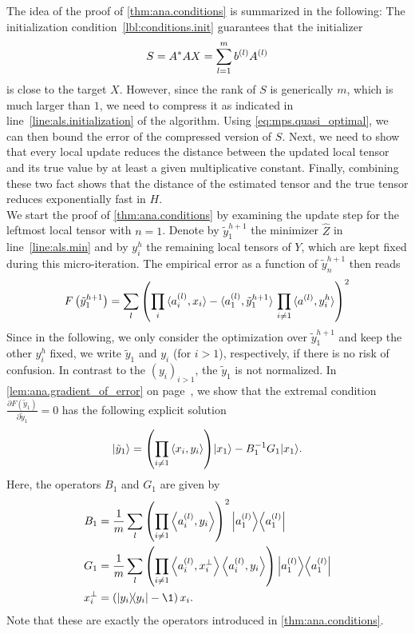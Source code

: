 The idea of the proof of \cref{thm:ana.conditions} is summarized in the following:
The initialization condition~\ref{lbl:conditions.init} guarantees that the initializer
\[
  S = {{A}^\ast}A X = \sum_{l=1}^m b^{(l)} A^{(l)}
\]
is close to the target $X$.
However, since the rank of $S$ is generically $m$, which is much larger than $1$, we need to compress it as indicated in line~\ref{line:als.initialization} of the algorithm.
Using \cref{eq:mps.quasi_optimal}, we can then bound the error of the compressed version of $S$.
Next, we need to show that every local update reduces the distance between the updated local tensor and its true value by at least a given multiplicative constant.
Finally, combining these two fact shows that the distance of the estimated tensor and the true tensor reduces exponentially fast in $H$.\\



We start the proof of \cref{thm:ana.conditions} by examining the update step for the leftmost local tensor with $n = 1$.
Denote by $\tilde y^{h+1}_1$ the minimizer $\hat Z$ in line~\ref{line:als.min} and by $y^h_i$ the remaining local tensors of $Y$, which are kept fixed during this micro-iteration.
The empirical error as a function of $\tilde y^{h+1}_n$ then reads
\[
  F\left(\tilde y^{h+1}_1\right)
  = \sum_l {\left(  \prod_i \braket{a^{(l)}_i, x_i} - \braket{a^{(l)}_1, \tilde y^{h+1}_1} \, \prod_{i \neq 1} \braket{a^{(l)}, y^{h}_i} \right)}^2
  \label{eq:ana.l2_error}
\]
Since in the following, we only consider the optimization over $\tilde y^{h+1}_1$ and keep the other $y^h_i$ fixed, we write $\tilde y_1$ and $y_i$ (for $i > 1$), respectively, if there is no risk of confusion.
In contrast to the $(y_i)_{i > 1}$, the $\tilde y_1$ is not normalized.
In \cref{lem:ana.gradient_of_error} on page~\pageref{lem:ana.gradient_of_error}, we show that the extremal condition $\frac{\partial F(\tilde y_1)}{\partial \tilde y_1} = 0$ has the following explicit solution
\[
  \label{eq:ana.explicit_minimizer}
  \ket{\tilde y_1} = {\left( \prod_{i \neq 1} \braket{x_i, y_i} \right)} \ket{x_1} - B_1^{-1} G_1 \ket{x_1}.
\]
Here, the operators $B_1$ and $G_1$ are given by
\begin{align}
  \label{eq:ana.b_operator}
  B_1 &= \frac{1}{m} \sum_l {\left( \prod_{i \neq 1} \Braket{a\ind{l}_i,y_i} \right)}^2 \Ketbra{a\ind{l}_1} \\
  \label{eq:ana.g_operator}
  G_1 &= \frac{1}{m} \sum_l {\left( \prod_{i \neq 1} \Braket{a\ind{l}_i, x_i^\perp} \Braket{a\ind{l}_i,y_i} \right)}\Ketbra{a\ind{l}_1} \\
  x_i^\perp &= \left(\ketbra{y_i} - \1 \right) x_i.
\end{align}
Note that these are exactly the operators introduced in \cref{thm:ana.conditions}.

